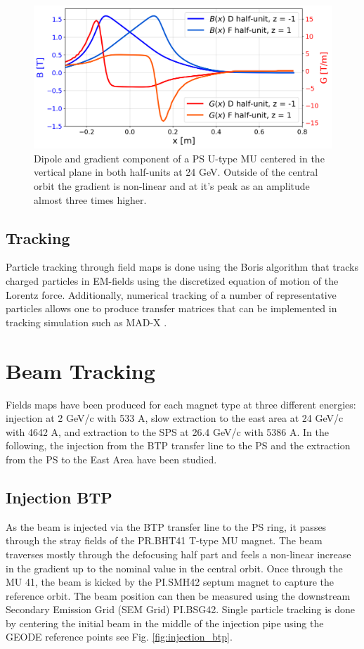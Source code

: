 \documentclass[a4paper,
               biblatex,     %
               keeplastbox,   %
               ]{jacow}
\begin{document}
\begin{figure}[!htb]
   \centering
   \includegraphics*[width=1.0\columnwidth, trim={0 0 0 0cm},clip]{Main_field_B_G.png}
   \caption{Dipole and gradient component of a  PS U-type MU centered in the vertical plane in both half-units at 24 GeV. Outside of the central orbit the gradient is non-linear and at it's peak as an amplitude almost three times higher.}
   \label{fig:gradient_field}
\end{figure}

\subsection{Tracking}
Particle tracking through field maps is done using the Boris algorithm that tracks charged particles in EM-fields using the discretized equation of motion of the Lorentz force\cite{qin_why_2013}\cite{ripperda_comprehensive_2018}. Additionally, numerical tracking of a number of representative particles allows one to produce transfer matrices that can be implemented in tracking simulation such as MAD-X \cite{yoon_method_2013}.

\section{Beam Tracking}
Fields maps have been produced for each magnet type at three different energies: injection at 2 GeV/c with 533 A, slow extraction to the east area at 24 GeV/c with 4642 A, and extraction to the SPS at 26.4 GeV/c with 5386 A. In the following, the injection from the BTP transfer line to the PS and the extraction from the PS to the East Area have been studied.

\subsection{Injection BTP}
As the beam is injected via the BTP transfer line to the PS ring, it passes through the stray fields of the PR.BHT41 T-type MU magnet. The beam traverses mostly through the defocusing half part and feels a non-linear increase in the gradient up to the nominal value in the central orbit. Once through the MU 41, the beam is kicked by the PI.SMH42 septum magnet to capture the reference orbit. The beam position can then be measured using the downstream Secondary Emission Grid (SEM Grid) PI.BSG42. Single particle tracking is done by centering the initial beam in the middle of the injection pipe using the GEODE reference points see Fig. \ref{fig:injection_btp}.
\end{document}
